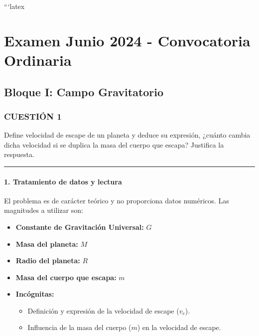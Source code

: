 ```latex
\chapter{Examen Junio 2024 - Convocatoria Ordinaria}
\label{chap:2024_jun_ord}

\section{Bloque I: Campo Gravitatorio}
\label{sec:grav_2024_jun_ord}

\subsection{CUESTIÓN 1}
\label{subsec:C1_2024_jun_ord}

\begin{cajaenunciado}
Define velocidad de escape de un planeta y deduce su expresión, ¿cuánto cambia dicha velocidad si se duplica la masa del cuerpo que escapa? Justifica la respuesta.
\end{cajaenunciado}
\hrule

\subsubsection*{1. Tratamiento de datos y lectura}
El problema es de carácter teórico y no proporciona datos numéricos. Las magnitudes a utilizar son:
\begin{itemize}
    \item \textbf{Constante de Gravitación Universal:} $G$
    \item \textbf{Masa del planeta:} $M$
    \item \textbf{Radio del planeta:} $R$
    \item \textbf{Masa del cuerpo que escapa:} $m$
    \item \textbf{Incógnitas:}
    \begin{itemize}
        \item Definición y expresión de la velocidad de escape ($v_e$).
        \item Influencia de la masa del cuerpo ($m$) en la velocidad de escape.
    \end{itemize}
\end{itemize}

